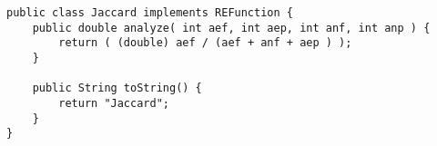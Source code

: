 \begin{lstlisting}
public class Jaccard implements REFunction {
	public double analyze( int aef, int aep, int anf, int anp ) {
		return ( (double) aef / (aef + anf + aep ) );
	}

	public String toString() {
		return "Jaccard";
	}
}
\end{lstlisting}
